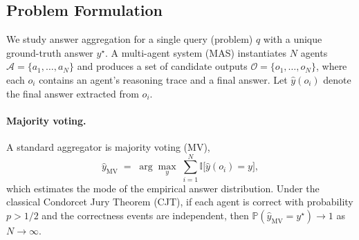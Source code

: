 \documentclass{article}
\theoremstyle{plain}
\theoremstyle{definition}
\theoremstyle{remark}
\begin{document}
\subsection{Problem Formulation}
\label{app:formal_setup}

We study answer aggregation for a single query (problem) $q$ with a unique ground-truth answer $y^\star$.
A multi-agent system (MAS) instantiates $N$ agents $\mathcal{A}=\{a_1,\dots,a_N\}$ and produces a set of candidate outputs
$\mathcal{O}=\{o_1,\dots,o_N\}$, where each $o_i$ contains an agent's reasoning trace and a final answer.
Let $\hat{y}(o_i)$ denote the final answer extracted from $o_i$.

\paragraph{Majority voting.}
A standard aggregator is majority voting (MV),
\begin{equation}
\label{eq:mv}
\hat{y}_{\mathrm{MV}}
\;=\;
\arg\max_{y}\; \sum_{i=1}^N \mathbb{I}\big[\hat{y}(o_i)=y\big],
\end{equation}
which estimates the mode of the empirical answer distribution.
Under the classical Condorcet Jury Theorem (CJT), if each agent is correct with probability $p>1/2$ and the correctness
events are independent, then $\mathbb{P}(\hat{y}_{\mathrm{MV}}=y^\star)\to 1$ as $N\to\infty$.
\end{document}
